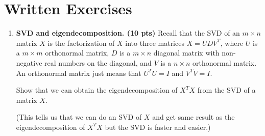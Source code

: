 
\section*{Written Exercises}

\begin{enumerate}

\item \textbf{SVD and eigendecomposition. (10 pts)}
Recall that the SVD of an $m \times n$ matrix $X$ is the factorization of $X$ into three matrices $X=UDV^{T}$, where $U$ is a $m \times m$ orthonormal matrix, $D$ is a $m \times n$ diagonal matrix with non-negative real numbers on the diagonal, and $V$ is a $n \times n$ orthonormal matrix. An orthonormal matrix just means that $U^{T}U = I$ and $V^{T}V = I$.

Show that we can obtain the eigendecomposition of $X^TX$ from the SVD of a matrix $X$. 


(This tells us that we can do an SVD of $X$ and get same result as the eigendecomposition of $X^TX$ but the SVD is faster and easier.)



\end{enumerate}
